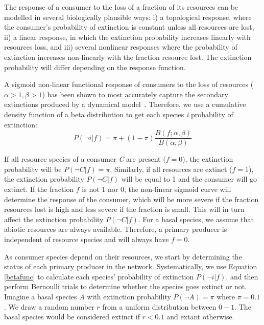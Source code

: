 \documentclass[12pt]{article}
\begin{document}
\begin{spacing}{2.0}
        The response of a consumer to the loss of a fraction of its resources can be modelled in several biologically plausible ways: i) a topological response, where the consumer's probability of extinction is constant unless all resources are lost, ii) a linear response, in which the extinction probability increases linearly with resources loss, and iii) several nonlinear responses where the probability of extinction increases non-linearly with the fraction resource lost. 
        The extinction probability will differ depending on the response function.
        
        
        A sigmoid non-linear functional response of consumers to the loss of resources ($\alpha >1, \beta >1$) has been shown to most accurately capture the secondary extinctions produced by a dynamical model~\citep{Eklof2013}.
        Therefore, we use a cumulative density function of a beta distribution to get each species \textit{i} probability of extinction:
        \begin{equation}
        \label{betafunc}
        P(\lnot i|f) = \pi + (1 - \pi) \frac{B(f;\alpha,\beta)}{B(\alpha,\beta)}
        \end{equation}
        

        \noindent If all resource species of a consumer \textit{C} are present ($f = 0$), the extinction probability will be $P(\lnot C|f) = \pi$. 
        Similarly, if all resources are extinct ($f = 1$), the extinction probability $P(\lnot C|f)$ will be equal to 1 and the consumer will go extinct.
        If the fraction $f$ is not 1 nor 0, the non-linear sigmoid curve will determine the response of the consumer, which will be more severe if the fraction resources lost is high and less severe if the fraction is small. 
        This will in turn affect the extinction probability $P(\lnot C|f)$. 
        For a basal species, we assume that abiotic resources are always available. 
        Therefore, a primary producer is independent of resource species and will always have $f = 0$.  
        

        As consumer species depend on their resources, we start by determining the status of each primary producer in the network.
        Systematically, we use Equation \ref{betafunc} to calculate each species' probability of extinction $P(\lnot i|f)$, and then perform Bernoulli trials to determine whether the species goes extinct or not. 
        Imagine a basal species \textit{A} with extinction probability $P(\lnot A) = \pi$ where $\pi = 0.1$. 
        We draw a random number $r$ from a uniform distribution between $0-1$.
        The basal species would be considered extinct if $r < 0.1$ and extant otherwise. 
        

\end{spacing}
\end{document}
